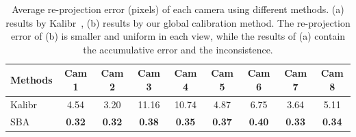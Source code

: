 \begin{table}
	\centering
	\caption{Average re-projection error (pixels) of each camera using different methods. (a) results by Kalibr~\cite{Maye2013Self}, (b) results by our global calibration method. The re-projection error of (b) is smaller and uniform in each view, while the results of (a) contain the accumulative error and the inconsistence. }
	\label{tab:reprojection}
	\begin{tabular}{l|cccccccc}
		\hline
		Methods & Cam 1 & Cam 2 & Cam 3 & Cam 4 & Cam 5 & Cam 6 & Cam 7 & Cam 8\\
		\hline
		Kalibr &4.54 &3.20 &11.16 &10.74 &4.87 &6.75 &3.64 &5.11\\
		
		SBA   &\textbf{0.32} &\textbf{0.32} &\textbf{0.38}  &\textbf{0.35} &\textbf{0.37} &\textbf{0.40} &\textbf{0.33} &\textbf{0.34} \\
		
		\hline
		
	\end{tabular}


\end{table}


